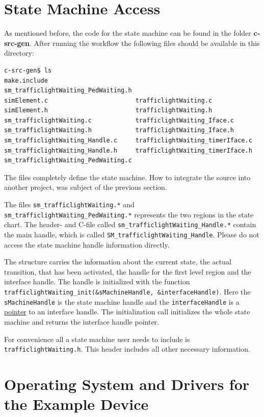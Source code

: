 \section{State Machine Access}

As mentioned before, the code for the state machine can be found in the folder
\textbf{c-src-gen}. After running the workflow the following files should be
available in this directory:

\begin{verbatim}
c-src-gen$ ls
make.include                        sm_trafficlightWaiting_PedWaiting.h
simElement.c                        trafficlightWaiting.c
simElement.h                        trafficlightWaiting.h
sm_trafficlightWaiting.c            trafficlightWaiting_Iface.c
sm_trafficlightWaiting.h            trafficlightWaiting_Iface.h
sm_trafficlightWaiting_Handle.c     trafficlightWaiting_timerIface.c
sm_trafficlightWaiting_Handle.h     trafficlightWaiting_timerIface.h
sm_trafficlightWaiting_PedWaiting.c
\end{verbatim}

The files completely define the state machine. How to integrate the source into
another project, was subject of the previous section.

The files \texttt{sm\_trafficlightWaiting.*} and
\texttt{sm\_trafficlightWaiting\_PedWaiting.*} represents the two regions in the
state chart. The header- and C-file called
\texttt{sm\_trafficlightWaiting\_Handle.*} contain the main handle, which is
called \texttt{SM\_trafficlightWaiting\_Handle}. Please do not access the state
machine handle information directly.

The structure carries the information about the current state, the actual
transition, that has been activated, the handle for the first level region and
the interface handle. The handle is initialized with the function
\texttt{trafficlightWaiting\_init(\&sMachineHandle, \&interfaceHandle)}. Here the
\texttt{sMachineHandle} is the state machine handle and the
\texttt{interfaceHandle} is a \underline{pointer} to an interface handle. The
initialization call initializes the whole state machine and returns the interface
handle pointer.

For convenience all a state machine user needs to include is
\texttt{trafficlightWaiting.h}. This header includes all other necessary
information.
 
\section{Operating System and Drivers for the Example Device}

